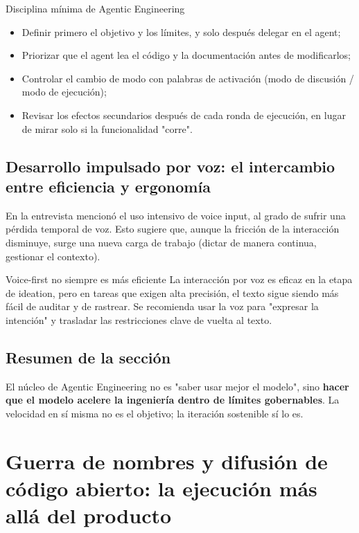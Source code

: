 \documentclass[a4paper]{article}
\begin{document}
\begin{importantbox}{Disciplina mínima de Agentic Engineering}
\begin{itemize}
    \item Definir primero el objetivo y los límites, y solo después delegar en el agent;
    \item Priorizar que el agent lea el código y la documentación antes de modificarlos;
    \item Controlar el cambio de modo con palabras de activación (modo de discusión / modo de ejecución);
    \item Revisar los efectos secundarios después de cada ronda de ejecución, en lugar de mirar solo si la funcionalidad "corre".
\end{itemize}
\end{importantbox}

\subsection{Desarrollo impulsado por voz: el intercambio entre eficiencia y ergonomía}

En la entrevista mencionó el uso intensivo de voice input, al grado de sufrir una pérdida temporal de voz. Esto sugiere que, aunque la fricción de la interacción disminuye, surge una nueva carga de trabajo (dictar de manera continua, gestionar el contexto).

\begin{warningbox}{Voice-first no siempre es más eficiente}
La interacción por voz es eficaz en la etapa de ideation, pero en tareas que exigen alta precisión, el texto sigue siendo más fácil de auditar y de rastrear. Se recomienda usar la voz para "expresar la intención" y trasladar las restricciones clave de vuelta al texto.
\end{warningbox}

\subsection{Resumen de la sección}
El núcleo de Agentic Engineering no es "saber usar mejor el modelo", sino \textbf{hacer que el modelo acelere la ingeniería dentro de límites gobernables}. La velocidad en sí misma no es el objetivo; la iteración sostenible sí lo es.

\section{Guerra de nombres y difusión de código abierto: la ejecución más allá del producto}
\end{document}
